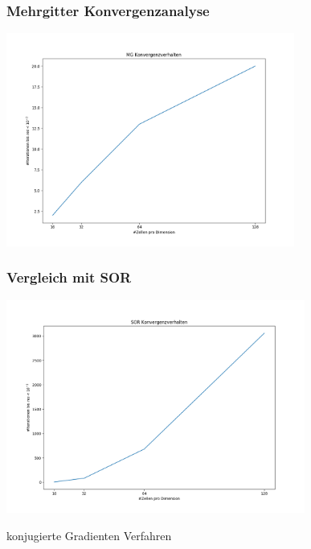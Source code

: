 \documentclass[]{beamer}
\begin{document}
\begin{frame}
  \frametitle{Mehrgitter Konvergenzanalyse}
  \begin{center}
    \includegraphics[width=0.9\linewidth, height=7cm]{mg_konvergenzverhalten.png}
  \end{center}
\end{frame}

\begin{frame}
  \frametitle{Vergleich mit SOR}
  \begin{center}
    \includegraphics[width=0.9\linewidth, height=7cm]{mg_vs_sor.png}
  \end{center}
\end{frame}


\begin{frame}
\begin{center}
 \Large konjugierte Gradienten Verfahren
 \end{center}
\end{frame}
\end{document}

